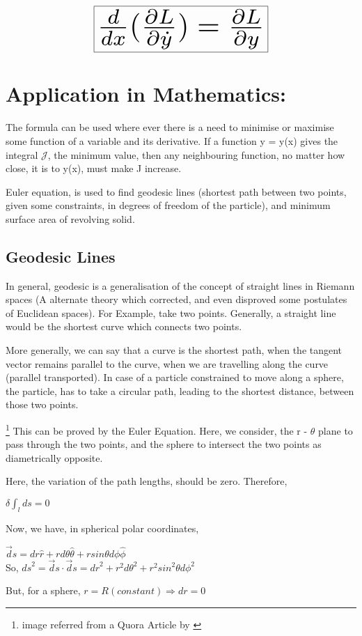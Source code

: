 \documentclass[a4paper]{article}
\begin{document}
\begin{center}
\label{sec1}
\begin{equation}
\fbox{\resizebox{0.5\textwidth}{!}{${d\over dx}({\partial{L}\over\partial\dot{y}}) = {\partial{L}\over\partial{y}}$}} \label{eq:eu-lag}
\end{equation}
\end{center}
\section{Application in Mathematics:}
The formula can be used where ever there is a need to minimise or maximise some function of a variable and its derivative. If a function y = y(x) gives the integral $\mathcal{J}$, the minimum value, then any neighbouring function, no matter how close, it is to y(x), must make J increase.\cite{var_cal}

Euler equation, is used to find geodesic lines (shortest path between two points, given some constraints, in degrees of freedom of the particle), and minimum surface area of revolving solid.

\subsection{Geodesic Lines}
In general, geodesic is a generalisation of the concept of straight lines in Riemann spaces (A alternate theory which corrected, and even disproved some postulates of Euclidean spaces). For Example, take two points. Generally, a straight line would be the shortest curve which connects two points. 

More generally, we can say that a curve is the shortest path, when the tangent vector remains parallel to the curve, when we are travelling along the curve (parallel transported). In case of a particle constrained to move along a sphere, the particle, has to take a circular path, leading to the shortest distance, between those two points. 

\footnote{image referred from a Quora Article by \cite{geode}}
This can be proved by the Euler Equation. Here, we consider, the r - $\theta$ plane to pass through the two points, and the sphere to intersect the two points as diametrically opposite.

Here, the variation of the path lengths, should be zero. Therefore,
\begin{center}
    $\delta\int_{\textit{l}}{ds} = 0$
\end{center}

Now, we have, in spherical polar coordinates,
\begin{center}
$\vec ds = dr \hat{r} + rd\theta \hat{\theta} +rsin\theta d\phi \hat{\phi}$\\
So,
 ${ds}^2 = \vec ds \cdot \vec ds = {dr}^2 + {r}^2{d\theta}^2 + {r}^2{sin}^2\theta {d\phi}^2$\\
\end{center}
But, for a sphere, $r = R (constant) \Longrightarrow dr = 0$
\end{document}
